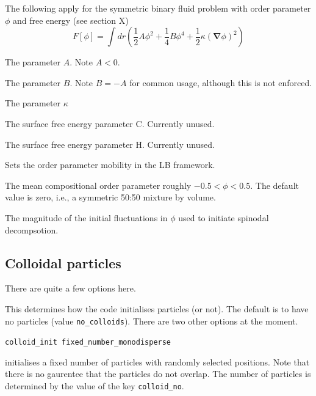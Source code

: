The following apply for the symmetric binary fluid problem with
order parameter $\phi$ and free energy (see section X) \cite{viv}
\begin{equation}
 F[\phi] = 
\int dr \left(
{\scriptstyle \frac{1}{2}}A\phi^2
+ {\scriptstyle \frac{1}{4}}B\phi^4
+ {\scriptstyle \frac{1}{2}}\kappa (\mathbf{\nabla}\phi)^2 \right)
\end{equation}


The parameter $A$. Note $A < 0$.


The parameter $B$. Note $B = -A$ for common usage, although this is
not enforced.


The parameter $\kappa$


The surface free energy parameter {C}. Currently unused.


The surface free energy parameter {H}. Currently unused.


Sets the order parameter mobility in the LB framework.


The mean compositional order parameter roughly $-0.5 < \phi < 0.5$.
The default value is zero, i.e., a symmetric 50:50 mixture by volume.


The magnitude of the initial fluctuations in $\phi$ used to
initiate spinodal decompsotion.


\subsection{Colloidal particles}

There are quite a few options here.


This determines how the code initialises particles (or not). The
default is to have no particles (value \texttt{no\_colloids}). There
are two other options at the moment.

\texttt{colloid\_init    fixed\_number\_monodisperse}

initialises a fixed number of particles with randomly selected
positions. Note that there is no gaurentee that the particles
do not overlap. The number of particles is determined by
the value of the key \texttt{colloid\_no}.

